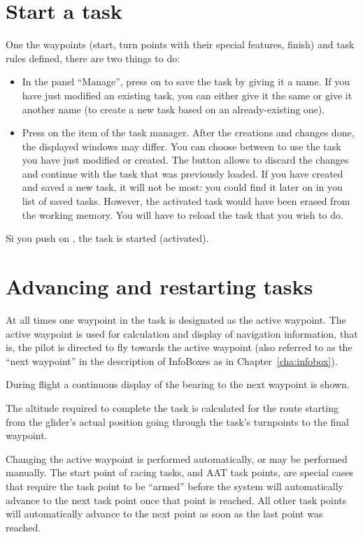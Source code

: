 \section{Start a task}\label{sec:start-task}
One the waypoints (start, turn points with their special features, finish) and task rules defined, there are two things to do:
\begin{itemize}
\item In the panel ``Manage'', press on  to save the task by giving it a name. If you have just modified an existing task, you can either give it the same or give it another name (to create a new task based on an already-existing one).
\item Press on the item  of the task manager.
After the creations and changes done, the displayed windows may differ.
You can choose between  to use the task you have just modified or created.
The button  allows to discard the changes and continue with the task that was previously loaded.
If you have created and saved a new task, it will not be most: you could find it later on in you list of saved tasks.
However, the activated task would have been erased from the working memory.
You will have to reload the task that you wish to do.
\end{itemize}
Si you push on , the task is started (activated).

\section{Advancing and restarting tasks}\label{sec:advanc-rest-tasks}
At all times one waypoint in the task is designated as the active
waypoint.  The active waypoint is used for calculation and display of
navigation information, that is, the pilot is directed to fly towards
the active waypoint (also referred to as the ``next waypoint'' in the
description of InfoBoxes as in Chapter~\ref{cha:infobox}).

During flight a continuous display of the bearing to the next waypoint is shown.

The altitude required to complete the task is calculated for the route starting
from the glider's actual position going through the task's turnpoints to the
final waypoint.

Changing the active waypoint is performed automatically, or may be performed manually.
The start point of racing tasks, and AAT task points, are special cases that require
the task point to be ``armed'' before the system will automatically advance to the next
task point once that point is reached.  All other task points will automatically
advance to the next point as soon as the last point was reached.

